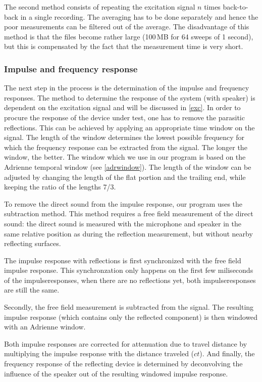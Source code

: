 The second method consists of repeating the excitation signal $n$ times back-to-back in a single recording. The averaging has to be done separately and hence the poor measurements can be filtered out of the average. The disadvantage of this method is that the files become rather large (100\,MB for 64 sweeps of 1 second), but this is compensated by the fact that the measurement time is very short.



\subsubsection{Impulse and frequency response}
The next step in the process is the determination of the impulse and frequency responses. The method to determine the response of the system (with speaker) is dependent on the excitation signal and will be discussed in \ref{exc}. In order to procure the response of the device under test, one has to remove the parasitic reflections. This can be achieved by applying an appropriate time window on the signal. The length of the window determines the lowest possible frequency for which the frequency response can be extracted from the signal. The longer the window, the better. The window which we use in our program is based on the Adrienne temporal window (see \ref{adrwindow}). The length of the window can be adjusted by changing the length of the flat portion and the trailing end, while keeping the ratio of the lengths 7/3.

To remove the direct sound from the impulse response, our program uses the subtraction method. This method requires a free field measurement of the direct sound: the direct sound is measured with the microphone and speaker in the same relative position as during the reflection measurement, but without nearby reflecting surfaces.

The impulse response with reflections is first synchronized with the free field impulse response. This synchronzation only happens on the first few miliseconds of the impulseresponses, when there are no reflections yet, both impulseresponses are still the same.

Secondly, the free field measurement is subtracted from the signal. The resulting impulse response (which contains only the reflected component) is then windowed with an Adrienne window.

Both impulse responses are corrected for attenuation due to travel distance by multiplying the impulse response with the distance traveled ($ct$). And finally, the frequency response of the reflecting device is determined by deconvolving the influence of the speaker out of the resulting windowed impulse response.



